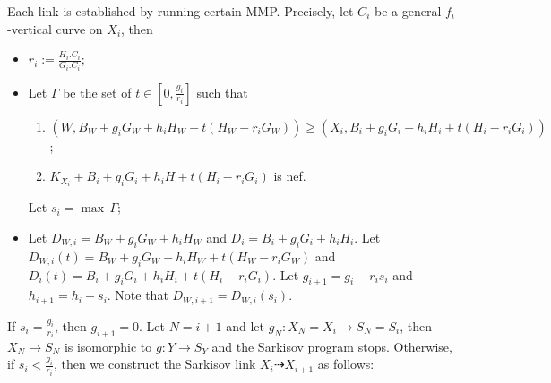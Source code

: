 \documentclass[11pt]{amsart}
\numberwithin{equation}{section}
\theoremstyle{definition}
\theoremstyle{definition}
\theoremstyle{definition}
\begin{document}
Each link is established by running certain MMP. Precisely,  let $C_{i}$ be a general $f_{i}$-vertical curve on $X_{i}$, then
  \begin{itemize}
    \item $r_{i}:=\frac{H_{i}.C_{i}}{G_{i}.C_{i}}$;
    \item Let $\Gamma$ be the set of $t\in [0,\frac{g_{i}}{r_{i}}] $ such that
          \begin{enumerate}
            \item\label{singularcondition} $\left(W,B_{W}+g_{i}G_{W}+h_{i}H_{W}+t(H_{W}-r_{i}G_{W})\right)\geqslant \left(X_{i},B_{i}+g_{i}G_{i}+h_{i}H_{i}+t\left(H_{i}-r_{i}G_{i}\right)\right)$;
            \item$K_{X_{i}}+B_{i}+g_{i}G_i+h_{i}H+t(H_{i}-r_{i}G_{i})$ is nef.
          \end{enumerate}
          Let $s_{i}=\max\, \Gamma $;
    \item Let $D_{W,i}=B_{W}+g_{i}G_{W}+h_{i}H_{W}$ and $D_{i}=B_{i}+g_{i}G_{i}+h_{i}H_{i}$. Let $D_{W,i}(t)=B_{W}+g_{i}G_{W}+h_{i}H_{W}+t(H_{W}-r_{i}G_{W})$ and $D_{i}(t)=B_{i}+g_{i}G_{i}+h_{i}H_{i}+t (H_{i}-r_{i}G_{i})$. Let $g_{i+1}=g_{i}-r_{i}s_{i}$ and $h_{i+1}=h_{i}+s_{i}$. Note that $D_{W,i+1}=D_{W,i}(s_{i})$.
  \end{itemize}
 If $s_{i}=\frac{g_{i}}{r_{i}}$, then $g_{i+1}=0$. Let $N=i+1$  and let $g_{N}:X_{N}=X_{i} \to S_{N}=S_{i}$, then $X_{N}\to S_{N}$ is isomorphic to $g:Y\to S_{Y}$  and  the Sarkisov program stops. Otherwise, if  $s_{i}<\frac{g_{i}}{r_{i}}$, then we construct the Sarkisov link $X_{i}\dashrightarrow X_{i+1}$ as follows:
\end{document}
